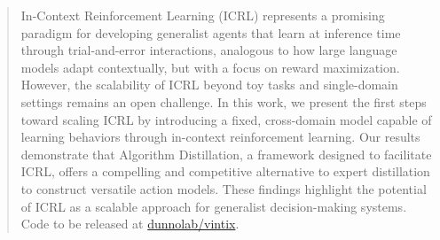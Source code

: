 \documentclass{article}
\theoremstyle{plain}
\theoremstyle{definition}
\theoremstyle{remark}
\begin{document}
\printAffiliationsAndNotice{\icmlEqualContribution}
\begin{abstract}
In-Context Reinforcement Learning (ICRL) represents a promising paradigm for developing generalist agents that learn at inference time through trial-and-error interactions, analogous to how large language models adapt contextually, but with a focus on reward maximization. However, the scalability of ICRL beyond toy tasks and single-domain settings remains an open challenge. In this work, we present the first steps toward scaling ICRL by introducing a fixed, cross-domain model capable of learning behaviors through in-context reinforcement learning. Our results demonstrate that Algorithm Distillation, a framework designed to facilitate ICRL, offers a compelling and competitive alternative to expert distillation to construct versatile action models. These findings highlight the potential of ICRL as a scalable approach for generalist decision-making systems. Code to be released at \href{https://github.com/dunnolab/vintix}{dunnolab/vintix}.
\end{abstract}
\end{document}
